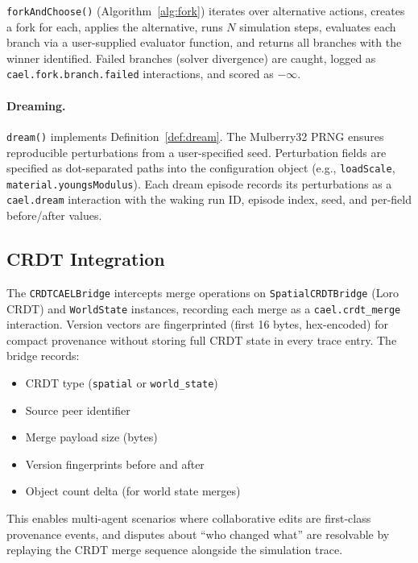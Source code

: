 \documentclass[sigconf,nonacm]{acmart}
\begin{document}
\texttt{forkAndChoose()} (Algorithm~\ref{alg:fork}) iterates
over alternative actions, creates a fork for each, applies the
alternative, runs $N$ simulation steps, evaluates each branch
via a user-supplied evaluator function, and returns all branches
with the winner identified. Failed branches (solver divergence)
are caught, logged as \texttt{cael.fork.branch.failed}
interactions, and scored as $-\infty$.

\paragraph{Dreaming.}
\texttt{dream()} implements Definition~\ref{def:dream}. The
Mulberry32 PRNG ensures reproducible perturbations from a
user-specified seed. Perturbation fields are specified as
dot-separated paths into the configuration object (e.g.,
\texttt{loadScale}, \texttt{material.youngsModulus}).
Each dream episode records its perturbations as a
\texttt{cael.dream} interaction with the waking run ID,
episode index, seed, and per-field before/after values.

\subsection{CRDT Integration}

The \texttt{CRDTCAELBridge} intercepts merge operations on
\texttt{SpatialCRDTBridge} (Loro CRDT) and \texttt{WorldState}
instances, recording each merge as a \texttt{cael.crdt\_merge}
interaction. Version vectors are fingerprinted (first 16 bytes,
hex-encoded) for compact provenance without storing full CRDT
state in every trace entry. The bridge records:
\begin{itemize}
  \item CRDT type (\texttt{spatial} or \texttt{world\_state})
  \item Source peer identifier
  \item Merge payload size (bytes)
  \item Version fingerprints before and after
  \item Object count delta (for world state merges)
\end{itemize}

This enables multi-agent scenarios where collaborative edits
are first-class provenance events, and disputes about ``who
changed what'' are resolvable by replaying the CRDT merge
sequence alongside the simulation trace.


\end{document}
